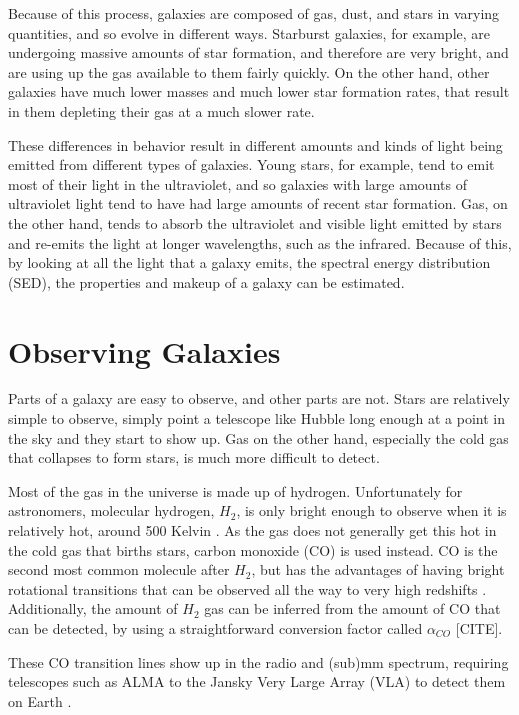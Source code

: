 \documentclass[twoside,single]{lion-msc}
\begin{document}
Because of this process, galaxies are composed of gas, dust, and stars in varying quantities, and so evolve in different ways. Starburst galaxies, for example, are undergoing massive amounts of star formation, and therefore are very bright, and are using up the gas available to them fairly quickly. On the other hand, other galaxies have much lower masses and much lower star formation rates, that result in them depleting their gas at a much slower rate.

These differences in behavior result in different amounts and kinds of light being emitted from different types of galaxies. Young stars, for example, tend to emit most of their light in the ultraviolet, and so galaxies with large amounts of ultraviolet light tend to have had large amounts of recent star formation. Gas, on the other hand, tends to absorb the ultraviolet and visible light emitted by stars and re-emits the light at longer wavelengths, such as the infrared. Because of this, by looking at all the light that a galaxy emits, the spectral energy distribution (SED), the properties and makeup of a galaxy can be estimated.

\section{Observing Galaxies}

Parts of a galaxy are easy to observe, and other parts are not. Stars are relatively simple to observe, simply point a telescope like Hubble long enough at a point in the sky and they start to show up. Gas on the other hand, especially the cold gas that collapses to form stars, is much more difficult to detect. 

Most of the gas in the universe is made up of hydrogen. Unfortunately for astronomers, molecular hydrogen, $H_2$, is only bright enough to observe when it is relatively hot, around 500 Kelvin \cite{decarli2019alma}. As the gas does not generally get this hot in the cold gas that births stars, carbon monoxide (CO) is used instead. CO is the second most common molecule after $H_2$, but has the advantages of having bright rotational transitions that can be observed all the way to very high redshifts \cite{walter2016alma, decarli2019alma}. Additionally, the amount of $H_2$ gas can be inferred from the amount of CO that can be detected, by using a straightforward conversion factor called $\alpha_{CO}$ [CITE]. 

These CO transition lines show up in the radio and (sub)mm spectrum, requiring telescopes such as ALMA to the Jansky Very Large Array (VLA) to detect them on Earth \cite{decarli2019alma}. 
\end{document}
